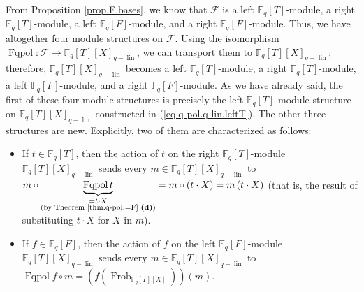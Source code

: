 \documentclass[numbers=enddot,12pt,final,onecolumn,notitlepage]{scrartcl}%
\theoremstyle{definition}
\begin{document}
From Proposition \ref{prop.F.bases}, we know that $\mathcal{F}$ is a left
$\mathbb{F}_{q}\left[  T\right]  $-module, a right $\mathbb{F}_{q}\left[
T\right]  $-module, a left $\mathbb{F}_{q}\left[  F\right]  $-module, and a
right $\mathbb{F}_{q}\left[  F\right]  $-module. Thus, we have altogether four
module structures on $\mathcal{F}$. Using the isomorphism
$\operatorname*{Fqpol}:\mathcal{F}\rightarrow\mathbb{F}_{q}\left[  T\right]
\left[  X\right]  _{q-\operatorname*{lin}}$, we can transport them to
$\mathbb{F}_{q}\left[  T\right]  \left[  X\right]  _{q-\operatorname*{lin}}$;
therefore, $\mathbb{F}_{q}\left[  T\right]  \left[  X\right]
_{q-\operatorname*{lin}}$ becomes a left $\mathbb{F}_{q}\left[  T\right]
$-module, a right $\mathbb{F}_{q}\left[  T\right]  $-module, a left
$\mathbb{F}_{q}\left[  F\right]  $-module, and a right $\mathbb{F}_{q}\left[
F\right]  $-module. As we have already said, the first of these four module
structures is precisely the left $\mathbb{F}_{q}\left[  T\right]  $-module
structure on $\mathbb{F}_{q}\left[  T\right]  \left[  X\right]
_{q-\operatorname*{lin}}$ constructed in (\ref{eq.q-pol.q-lin.leftT}). The
other three structures are new. Explicitly, two of them are characterized as follows:

\begin{itemize}
\item If $t\in\mathbb{F}_{q}\left[  T\right]  $, then the action of $t$ on the
right $\mathbb{F}_{q}\left[  T\right]  $-module $\mathbb{F}_{q}\left[
T\right]  \left[  X\right]  _{q-\operatorname*{lin}}$ sends every
$m\in\mathbb{F}_{q}\left[  T\right]  \left[  X\right]  _{q-\operatorname*{lin}%
}$ to $m\circ\underbrace{\operatorname*{Fqpol}t}_{\substack{=t\cdot
X\\\text{(by Theorem \ref{thm.q-pol.=F} \textbf{(d)})}}}=m\circ\left(  t\cdot
X\right)  =m\left(  t\cdot X\right)  $ (that is, the result of substituting
$t\cdot X$ for $X$ in $m$).

\item If $f\in\mathbb{F}_{q}\left[  F\right]  $, then the action of $f$ on the
left $\mathbb{F}_{q}\left[  F\right]  $-module $\mathbb{F}_{q}\left[
T\right]  \left[  X\right]  _{q-\operatorname*{lin}}$ sends every
$m\in\mathbb{F}_{q}\left[  T\right]  \left[  X\right]  _{q-\operatorname*{lin}%
}$ to $\operatorname*{Fqpol}f\circ m= \left( f\left(  \operatorname*{Frob}%
\nolimits_{\mathbb{F}_{q}\left[  T\right]  \left[  X\right]  }\right)
\right)  \left( m\right) $.
\end{itemize}
\end{document}
